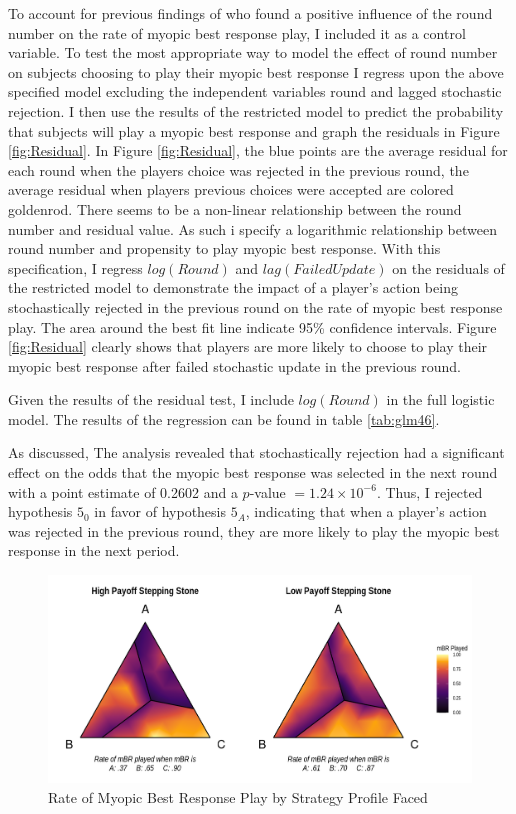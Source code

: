 To account for previous findings of \cite{lim2016experimental} who found a positive influence of the round number on the rate of myopic best response play, I included it as a control variable. To test the most appropriate way to model the effect of round number on subjects choosing to play their myopic best response I regress upon the above specified model excluding the independent variables round and lagged stochastic rejection. I then use the results of the restricted model to predict the probability that subjects will play a myopic best response and graph the residuals in Figure \ref{fig:Residual}. In Figure \ref{fig:Residual}, the blue points are the average residual for each round when the players choice was rejected in the previous round, the average residual when players\textquotesingle{} previous choices were accepted are colored goldenrod. There seems to be a non-linear relationship between the round number and residual value. As such i specify a logarithmic relationship between round number and propensity to play myopic best response. With this specification, I regress $log(Round)$ and $lag(Failed Update)$ on the residuals of the restricted model to demonstrate the impact of a player's action being stochastically rejected in the previous round on the rate of myopic best response play. The area around the best fit line indicate 95\% confidence intervals. Figure \ref{fig:Residual} clearly shows that players are more likely to choose to play their myopic best response after failed stochastic update in the previous round.

Given the results of the residual test, I include $log(Round)$ in the full logistic model. The results of the regression can be found in table \ref{tab:glm46}. 

As discussed, The analysis revealed that stochastically rejection had a significant effect on the odds that the myopic best response was selected in the next round with a point estimate of 0.2602 and a $p$-value $= 1.24 \times 10^{-6}$. Thus, I rejected hypothesis $5_0$ in favor of hypothesis $5_A$, indicating that when a player's action was rejected in the previous round, they are more likely to play the myopic best response in the next period.

\begin{figure}[h]
\captionsetup{justification=centering}
  \caption{Rate of Myopic Best Response Play by Strategy Profile Faced}
   \label{fig:Games23MBRPlot}
    \includegraphics[width = \textwidth]{Images/Games23MBRPlot.png}
\end{figure}

